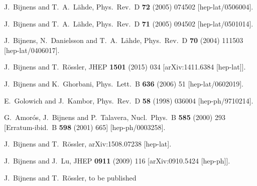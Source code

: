 \documentclass[12pt,a4paper]{article}
\begin{document}
\begin{thebibliography}{99}
  J.~Bijnens and T.~A.~L\"ahde,
  Phys.\ Rev.\ D {\bf 72} (2005) 074502
  [hep-lat/0506004].

  J.~Bijnens and T.~A.~L\"ahde,
  Phys.\ Rev.\ D {\bf 71} (2005) 094502
  [hep-lat/0501014].

  J.~Bijnens, N.~Danielsson and T.~A.~L\"ahde,
  Phys.\ Rev.\ D {\bf 70} (2004) 111503
  [hep-lat/0406017].

  J.~Bijnens and T.~Rössler,
  JHEP {\bf 1501} (2015) 034
  [arXiv:1411.6384 [hep-lat]].

  J.~Bijnens and K.~Ghorbani,
  Phys.\ Lett.\ B {\bf 636} (2006) 51
  [hep-lat/0602019].

  E.~Golowich and J.~Kambor,
  Phys.\ Rev.\ D {\bf 58} (1998) 036004
  [hep-ph/9710214].

  G.~Amor\'os, J.~Bijnens and P.~Talavera,
  Nucl.\ Phys.\ B {\bf 585} (2000) 293
   [Erratum-ibid.\ B {\bf 598} (2001) 665]
  [hep-ph/0003258].

  J.~Bijnens and T.~Rössler,
  arXiv:1508.07238 [hep-lat].

  J.~Bijnens and J.~Lu,
  JHEP {\bf 0911} (2009) 116
  [arXiv:0910.5424 [hep-ph]].

  J.~Bijnens and T.~Rössler, to be published

\end{thebibliography}

\newpage
{}
{}\printindex
\end{document}
